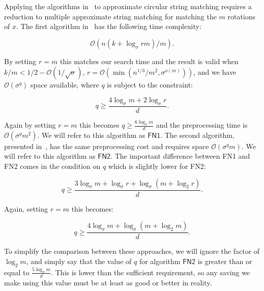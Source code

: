 \documentclass[runningheads, envcountsame, a4paper]{llncs}\usepackage{etex}
\newcommand{\cO}{\mathcal{O}}
\begin{document}
Applying the algorithms in~\cite{Fredriksson:2004:ASM:1005813.1041513} to approximate circular string matching requires a reduction to multiple approximate string matching for matching the $m$ rotations of $x$. The first algorithm in~\cite{Fredriksson:2004:ASM:1005813.1041513} has the following time complexity:

$$\cO(n(k + \log_\sigma rm) /m).$$

\noindent By setting $r=m$ this matches our search time and the result is valid when $k/m<1/2-\cO(1/\sqrt{\sigma})$, $r= \cO(\min(n^{1/3} /m^2, \sigma^{o(m)}))$, and we have $\cO(\sigma^q)$ space available, where $q$ is subject to the constraint: 

$$q \geq \frac{4 \log_\sigma m + 2 \log_\sigma r}{d}.$$

\noindent Again by setting $r=m$ this becomes
$q \geq \frac{6 \log_\sigma m}{d}$ and the preprocessing time is $\cO(\sigma^q m^2)$. We will refer to this algorithm as $\textsf{FN1}$. The second algorithm, presented in~\cite{Fredriksson:2004:ASM:1005813.1041513}, has the same preprocessing cost and requires space $\cO(\sigma^q m)$. We will refer to this algorithm as $\textsf{FN2}$. The important difference between \textsf{FN1} and \textsf{FN2} comes in the condition on $q$ which is slightly lower for \textsf{FN2}:

$$q \geq \frac{3 \log_\sigma m + \log_\sigma r + \log_\sigma (m + \log_2 r)}{d}.$$

\noindent Again, setting $r=m$ this becomes:

$$q \geq \frac{4 \log_\sigma m + \log_\sigma (m + \log_2 m)}{d}.$$

To simplify the comparison between these approaches, we will ignore the factor of $\log_2 m$, and simply say that the value of $q$ for algorithm $\textsf{FN2}$ is greater than or equal to $\frac{5 \log_\sigma m}{d}$. This is lower than the sufficient requirement, so any saving we make using this value must be at least as good or better in reality.
\end{document}
